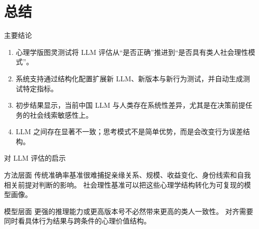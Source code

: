 \section{总结}

\begin{frame}{主要结论}
  \begin{enumerate}
    \item 心理学版图灵测试将 LLM 评估从“是否正确”推进到“是否具有类人社会理性模式”。
    \item 系统支持通过结构化配置扩展新 LLM、新版本与新行为测试，并自动生成测试特定指标。
    \item 初步结果显示，当前中国 LLM 与人类存在系统性差异，尤其是在决策前提任务的社会线索敏感性上。
    \item LLM 之间存在显著不一致；思考模式不是简单优势，而是会改变行为误差结构。
  \end{enumerate}
\end{frame}

\begin{frame}{对 LLM 评估的启示}
  \begin{block}{方法层面}
    传统准确率基准很难捕捉亲缘关系、规模、收益变化、身份线索和自我相关前提对判断的影响。
    社会理性基准可以把这些心理学结构转化为可复现的模型画像。
  \end{block}

  \vspace{0.6em}
  \begin{block}{模型层面}
    更强的推理能力或更高版本号不必然带来更高的类人一致性。
    对齐需要同时看具体行为结果与跨条件的心理价值结构。
  \end{block}

  \vspace{0.6em}
  \centering
  \Large{}
\end{frame}
